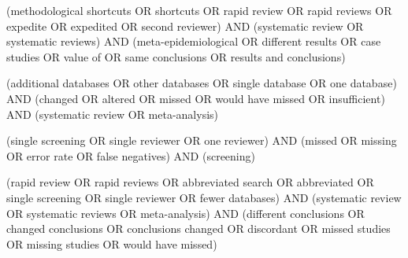 \begin{description}[style=nextline,font=\normalfont\bfseries]
\item[q2e, support query] {\footnotesize\ttfamily\raggedright (\textquotedbl{}methodological shortcuts\textquotedbl{} OR shortcuts OR \textquotedbl{}rapid review\textquotedbl{} OR \textquotedbl{}rapid reviews\textquotedbl{} OR expedite OR expedited OR \textquotedbl{}second reviewer\textquotedbl{}) AND (\textquotedbl{}systematic review\textquotedbl{} OR \textquotedbl{}systematic reviews\textquotedbl{}) AND (\textquotedbl{}meta-epidemiological\textquotedbl{} OR \textquotedbl{}different results\textquotedbl{} OR \textquotedbl{}case studies\textquotedbl{} OR \textquotedbl{}value of\textquotedbl{} OR \textquotedbl{}same conclusions\textquotedbl{} OR \textquotedbl{}results and conclusions\textquotedbl{})\par}
\item[q2x, counter query] {\footnotesize\ttfamily\raggedright (\textquotedbl{}additional databases\textquotedbl{} OR \textquotedbl{}other databases\textquotedbl{} OR \textquotedbl{}single database\textquotedbl{} OR \textquotedbl{}one database\textquotedbl{}) AND (changed OR altered OR missed OR \textquotedbl{}would have missed\textquotedbl{} OR insufficient) AND (\textquotedbl{}systematic review\textquotedbl{} OR \textquotedbl{}meta-analysis\textquotedbl{})\par}
\item[q2y, counter query] {\footnotesize\ttfamily\raggedright (\textquotedbl{}single screening\textquotedbl{} OR \textquotedbl{}single reviewer\textquotedbl{} OR \textquotedbl{}one reviewer\textquotedbl{}) AND (missed OR missing OR \textquotedbl{}error rate\textquotedbl{} OR \textquotedbl{}false negatives\textquotedbl{}) AND (screening)\par}
\item[q2z, counter query] {\footnotesize\ttfamily\raggedright (\textquotedbl{}rapid review\textquotedbl{} OR \textquotedbl{}rapid reviews\textquotedbl{} OR \textquotedbl{}abbreviated search\textquotedbl{} OR abbreviated OR \textquotedbl{}single screening\textquotedbl{} OR \textquotedbl{}single reviewer\textquotedbl{} OR \textquotedbl{}fewer databases\textquotedbl{}) AND (\textquotedbl{}systematic review\textquotedbl{} OR \textquotedbl{}systematic reviews\textquotedbl{} OR \textquotedbl{}meta-analysis\textquotedbl{}) AND (\textquotedbl{}different conclusions\textquotedbl{} OR \textquotedbl{}changed conclusions\textquotedbl{} OR \textquotedbl{}conclusions changed\textquotedbl{} OR discordant OR \textquotedbl{}missed studies\textquotedbl{} OR \textquotedbl{}missing studies\textquotedbl{} OR \textquotedbl{}would have missed\textquotedbl{})\par}
\end{description}
